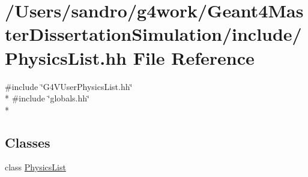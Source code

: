 \hypertarget{_physics_list_8hh}{\section{/\-Users/sandro/g4work/\-Geant4\-Master\-Dissertation\-Simulation/include/\-Physics\-List.hh File Reference}
\label{_physics_list_8hh}
}
{\ttfamily \#include \char`\"{}G4\-V\-User\-Physics\-List.\-hh\char`\"{}}\\*
{\ttfamily \#include \char`\"{}globals.\-hh\char`\"{}}\\*
\subsection*{Classes}
\begin{DoxyCompactItemize}
\item 
class \hyperlink{class_physics_list}{Physics\-List}
\end{DoxyCompactItemize}
